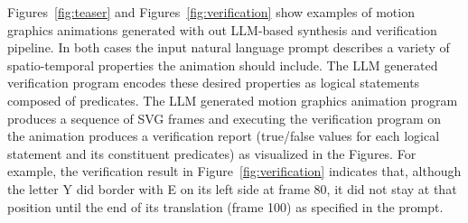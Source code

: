 Figures~\ref{fig:teaser} and Figures~\ref{fig:verification} show
examples of motion graphics animations generated with out LLM-based
synthesis and verification pipeline.  In both cases the input
natural language prompt describes a variety of spatio-temporal properties
the animation should include.
%
%
The LLM generated verification program
encodes these desired properties as logical statements
composed of \dslname{} predicates.
%
The LLM generated motion graphics animation program produces a
sequence of SVG frames and executing the verification program on the
animation produces a verification report (true/false values for each
logical statement and its constituent predicates) as visualized in the
Figures.
%
%
For example, the verification result in Figure~\ref{fig:verification}
indicates that, although the letter Y did border with E on its left
side at frame 80, it did not stay at that position until the end of
its translation (frame 100) as specified in the prompt.  



